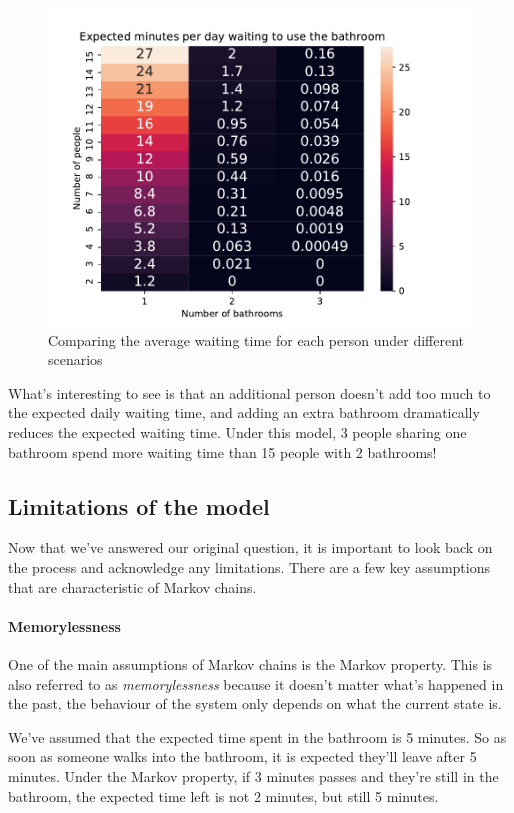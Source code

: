 \begin{figure}[H]
	\centering
	\includegraphics[scale=1]{../../images/comparison}
	\caption{Comparing the average waiting time for each person under different scenarios}
	\label{fig: comparison}
\end{figure}

What's interesting to see is that an additional person doesn't add too much to the expected daily waiting time, and adding an extra bathroom dramatically reduces the expected waiting time. Under this model, 3 people sharing one bathroom spend more waiting time than 15 people with 2 bathrooms!

\subsection*{Limitations of the model}
Now that we've answered our original question, it is important to look back on the process and acknowledge any limitations. There are a few key assumptions that are characteristic of Markov chains.

\paragraph{Memorylessness}
One of the main assumptions of Markov chains is the Markov property. This is also referred to as \textit{memorylessness} because it doesn't matter what's happened in the past, the behaviour of the system only depends on what the current state is. 

We've assumed that the expected time spent in the bathroom is 5 minutes. So as soon as someone walks into the bathroom, it is expected they'll leave after 5 minutes. Under the Markov property, if 3 minutes passes and they're still in the bathroom, the expected time left is not 2 minutes, but still 5 minutes.

